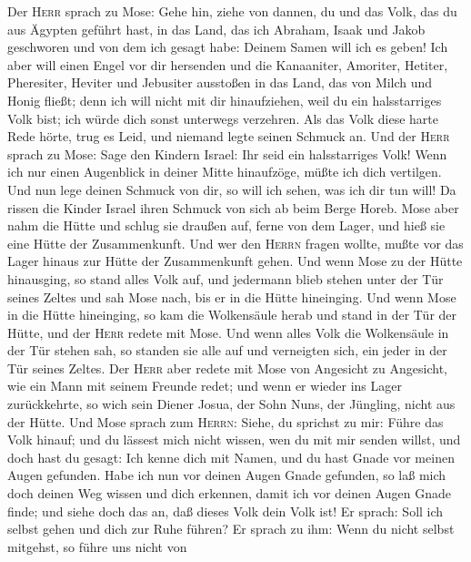  Der \textsc{Herr} sprach zu Mose: Gehe hin, ziehe von
dannen, du und das Volk, das du aus Ägypten geführt hast, in das Land,
das ich Abraham, Isaak und Jakob geschworen und von dem ich gesagt habe:
Deinem Samen will ich es geben!  Ich aber will einen Engel
vor dir hersenden und die Kanaaniter, Amoriter, Hetiter, Pheresiter,
Heviter und Jebusiter ausstoßen  in das Land, das von
Milch und Honig fließt; denn ich will nicht mit dir hinaufziehen, weil
du ein halsstarriges Volk bist; ich würde dich sonst unterwegs
verzehren.  Als das Volk diese harte Rede hörte, trug es
Leid, und niemand legte seinen Schmuck an.  Und der
\textsc{Herr} sprach zu Mose: Sage den Kindern Israel: Ihr seid ein
halsstarriges Volk! Wenn ich nur einen Augenblick in deiner Mitte
hinaufzöge, müßte ich dich vertilgen. Und nun lege deinen Schmuck von
dir, so will ich sehen, was ich dir tun will!  Da rissen
die Kinder Israel ihren Schmuck von sich ab beim Berge Horeb.
 Mose aber nahm die Hütte und schlug sie draußen auf,
ferne von dem Lager, und hieß sie eine Hütte der Zusammenkunft. Und wer
den \textsc{Herrn} fragen wollte, mußte vor das Lager hinaus zur Hütte
der Zusammenkunft gehen.  Und wenn Mose zu der Hütte
hinausging, so stand alles Volk auf, und jedermann blieb stehen unter
der Tür seines Zeltes und sah Mose nach, bis er in die Hütte hineinging.
 Und wenn Mose in die Hütte hineinging, so kam die
Wolkensäule herab und stand in der Tür der Hütte, und der \textsc{Herr}
redete mit Mose.  Und wenn alles Volk die Wolkensäule in
der Tür stehen sah, so standen sie alle auf und verneigten sich, ein
jeder in der Tür seines Zeltes.  Der \textsc{Herr} aber
redete mit Mose von Angesicht zu Angesicht, wie ein Mann mit seinem
Freunde redet; und wenn er wieder ins Lager zurückkehrte, so wich sein
Diener Josua, der Sohn Nuns, der Jüngling, nicht aus der Hütte.
 Und Mose sprach zum \textsc{Herrn}: Siehe, du sprichst
zu mir: Führe das Volk hinauf; und du lässest mich nicht wissen, wen du
mit mir senden willst, und doch hast du gesagt: Ich kenne dich mit
Namen, und du hast Gnade vor meinen Augen gefunden.  Habe
ich nun vor deinen Augen Gnade gefunden, so laß mich doch deinen Weg
wissen und dich erkennen, damit ich vor deinen Augen Gnade finde; und
siehe doch das an, daß dieses Volk dein Volk ist!  Er
sprach: Soll ich selbst gehen und dich zur Ruhe führen? 
Er sprach zu ihm: Wenn du nicht selbst mitgehst, so führe uns nicht von
